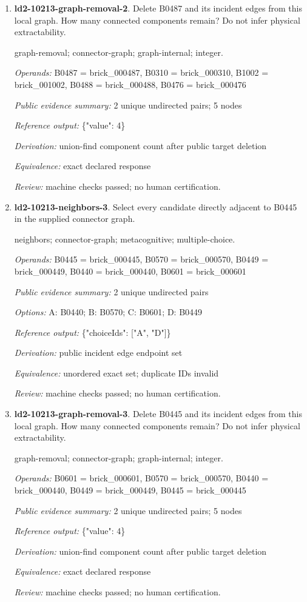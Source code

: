 \begin{enumerate}
\item \textbf{ld2-10213-graph-removal-2}. Delete B0487 and its incident edges from this local graph. How many connected components remain? Do not infer physical extractability.
\par{\small graph-removal; connector-graph; graph-internal; integer.\par\textit{Operands:} B0487 = brick\_000487, B0310 = brick\_000310, B1002 = brick\_001002, B0488 = brick\_000488, B0476 = brick\_000476\par\textit{Public evidence summary:} 2 unique undirected pairs; 5 nodes\par\textit{Reference output:} \{"value": 4\}\par\textit{Derivation:} union-find component count after public target deletion\par\textit{Equivalence:} exact declared response\par\textit{Review:} machine checks passed; no human certification.}
\item \textbf{ld2-10213-neighbors-3}. Select every candidate directly adjacent to B0445 in the supplied connector graph.
\par{\small neighbors; connector-graph; metacognitive; multiple-choice.\par\textit{Operands:} B0445 = brick\_000445, B0570 = brick\_000570, B0449 = brick\_000449, B0440 = brick\_000440, B0601 = brick\_000601\par\textit{Public evidence summary:} 2 unique undirected pairs\par\textit{Options:} A: B0440; B: B0570; C: B0601; D: B0449\par\textit{Reference output:} \{"choiceIds": ["A", "D"]\}\par\textit{Derivation:} public incident edge endpoint set\par\textit{Equivalence:} unordered exact set; duplicate IDs invalid\par\textit{Review:} machine checks passed; no human certification.}
\item \textbf{ld2-10213-graph-removal-3}. Delete B0445 and its incident edges from this local graph. How many connected components remain? Do not infer physical extractability.
\par{\small graph-removal; connector-graph; graph-internal; integer.\par\textit{Operands:} B0601 = brick\_000601, B0570 = brick\_000570, B0440 = brick\_000440, B0449 = brick\_000449, B0445 = brick\_000445\par\textit{Public evidence summary:} 2 unique undirected pairs; 5 nodes\par\textit{Reference output:} \{"value": 4\}\par\textit{Derivation:} union-find component count after public target deletion\par\textit{Equivalence:} exact declared response\par\textit{Review:} machine checks passed; no human certification.}

\end{enumerate}
